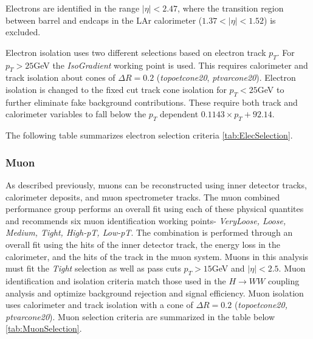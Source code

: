 Electrons are identified in the range $|\eta|<2.47$, where the transition region between barrel and endcaps in the LAr calorimeter ($1.37<|\eta|<1.52$) is excluded.

Electron isolation uses two different selections based on electron track $p_T$. For $p_T>25$GeV the \textit{IsoGradient} working point is used. This requires calorimeter and track isolation about cones of $\Delta R =0.2$ (\textit{topoetcone20}, \textit{ptvarcone20}). Electron isolation is changed to the fixed cut track cone isolation for $p_T <25$GeV to further eliminate fake background contributions. These require both track and calorimeter variables to fall below the $p_T$ dependent $0.1143\times p_T + 92.14$. 

The following table summarizes electron selection criteria \ref{tab:ElecSelection}.

\begin{table}[h!]
  \centering
  \caption{Electron selections}
  \label{tab:ElecSelection}
\end{table}

\subsubsection{Muon}

As described previously, muons can be reconstructed using inner detector tracks, calorimeter deposits, and muon spectrometer tracks. The muon combined performance group performs an overall fit using each of these physical quantites and recommends six muon identification working points- \textit{VeryLoose, Loose, Medium, Tight, High-pT, Low-pT}.  The combination is performed through an overall fit using the hits of the inner detector track, the energy loss in the calorimeter, and the hits of the track in the muon system. Muons in this analysis must fit the \textit{Tight} selection as well as pass cuts $p_T>15$GeV and $|\eta|<2.5$. Muon identification and isolation criteria match those used in the $H\rightarrow WW$ coupling analysis and optimize background rejection and signal efficiency. Muon isolation uses calorimeter and track isolation with a cone of $\Delta R=0.2$ (\textit{topoetcone20, ptvarcone20}). 
Muon selection criteria are summarized in the table below \ref{tab:MuonSelection}. 

